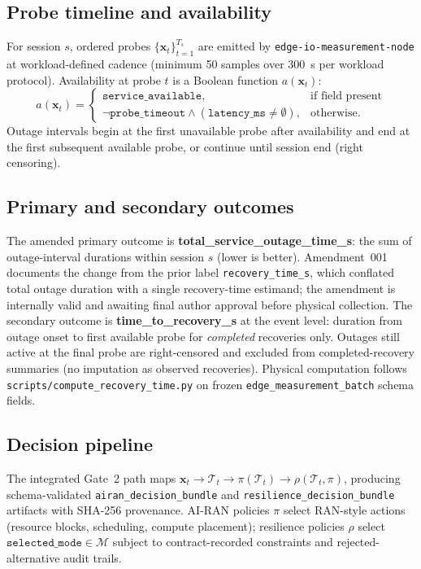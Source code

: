 \subsection{Probe timeline and availability}
For session $s$, ordered probes $\{\mathbf{x}_t\}_{t=1}^{T_s}$ are emitted by \texttt{edge-io-measurement-node} at workload-defined cadence (minimum 50 samples over 300~s per workload protocol).
Availability at probe $t$ is a Boolean function $a(\mathbf{x}_t)$:
\begin{equation}
a(\mathbf{x}_t)=
\begin{cases}
\texttt{service\_available}, & \text{if field present} \\
\neg\texttt{probe\_timeout}\land(\texttt{latency\_ms}\neq\emptyset), & \text{otherwise}.
\end{cases}
\end{equation}
Outage intervals begin at the first unavailable probe after availability and end at the first subsequent available probe, or continue until session end (right censoring).

\subsection{Primary and secondary outcomes}
The amended primary outcome is \textbf{total\_service\_outage\_time\_s}: the sum of outage-interval durations within session $s$ (lower is better).
Amendment~001 documents the change from the prior label \texttt{recovery\_time\_s}, which conflated total outage duration with a single recovery-time estimand; the amendment is internally valid and awaiting final author approval before physical collection.
The secondary outcome is \textbf{time\_to\_recovery\_s} at the event level: duration from outage onset to first available probe for \emph{completed} recoveries only.
Outages still active at the final probe are right-censored and excluded from completed-recovery summaries (no imputation as observed recoveries).
Physical computation follows \texttt{scripts/compute\_recovery\_time.py} on frozen \texttt{edge\_measurement\_batch} schema fields.

\subsection{Decision pipeline}
The integrated Gate~2 path maps $\mathbf{x}_t \rightarrow \mathcal{T}_t \rightarrow \pi(\mathcal{T}_t) \rightarrow \rho(\mathcal{T}_t,\pi)$, producing schema-validated \texttt{airan\_decision\_bundle} and \texttt{resilience\_decision\_bundle} artifacts with SHA-256 provenance.
AI-RAN policies $\pi$ select RAN-style actions (resource blocks, scheduling, compute placement); resilience policies $\rho$ select $\texttt{selected\_mode}\in\mathcal{M}$ subject to contract-recorded constraints and rejected-alternative audit trails.
